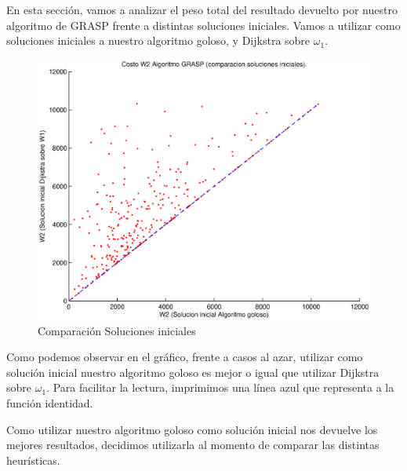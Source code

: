 En esta sección, vamos a analizar el peso total del resultado devuelto por nuestro algoritmo de GRASP frente a distintas soluciones iniciales. Vamos a utilizar como soluciones iniciales a nuestro algoritmo goloso, y Dijkstra sobre $\omega_1$.

\begin{figure}[H]
  \begin{center}
    \begin{minipage}{0.5\linewidth}
      \includegraphics[width=\linewidth]{graficos/grasp_comparacion_soluciones_iniciales.eps}
      \caption{Comparación Soluciones iniciales}\label{fig:grasp-proporcion}
    \end{minipage}
  \end{center}
\end{figure}

Como podemos observar en el gráfico, frente a casos al azar, utilizar como solución inicial nuestro algoritmo goloso es mejor o igual que utilizar Dijkstra sobre $\omega_1$. Para facilitar la lectura, imprimimos una línea azul que representa a la función identidad.

Como utilizar nuestro algoritmo goloso como solución inicial nos devuelve los mejores resultados, decidimos utilizarla al momento de comparar las distintas heurísticas.